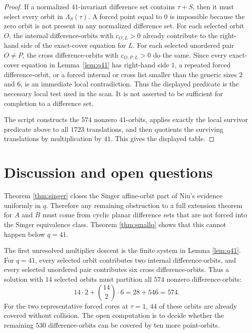 \documentclass[11pt,letterpaper]{amsart}
\theoremstyle{plain}
\begin{document}
\begin{proof}
If a normalized \(41\)-invariant difference set contains \(\tau+S\),
then it must select every orbit in \(\Lambda_S(\tau)\).  A forced point
equal to \(0\) is impossible because the zero orbit is not present in
any normalized difference set.  For each selected orbit \(O\), the
internal difference-orbits with \(c_{O,L}>0\) already contribute to the
right-hand side of the exact-cover equation for \(L\).  For each
selected unordered pair \(O\ne P\), the cross difference-orbits with
\(c_{O,P,L}>0\) do the same.  Since every exact-cover equation in
Lemma~\ref{lem:q41} has right-hand side \(1\), a repeated forced
difference-orbit, or a forced internal or cross list smaller than the
generic sizes \(2\) and \(6\), is an immediate local contradiction.
Thus the displayed predicate is the necessary local test used in the
scan.  It is not asserted to be sufficient for completion to a
difference set.

\QFortyOneAuditBlock
The script constructs the \(574\) nonzero \(41\)-orbits, applies exactly
the local survivor predicate above to all \(1723\) translations, and then
quotients the surviving translations by multiplication by \(41\).  This
gives the displayed table.
\end{proof}

\section{Discussion and open questions}

Theorem \ref{thm:singer} closes the Singer affine-orbit part of Niu's
evidence uniformly in \(q\).  Therefore any remaining obstruction to a
full extension theorem for \(A\) and \(B\) must come from cyclic planar
difference sets that are not forced into the Singer equivalence class.
Theorem \ref{thm:smallq} shows that this cannot happen below \(q=41\).

The first unresolved multiplier descent is the finite system in
Lemma \ref{lem:q41}.  For \(q=41\), every selected orbit contributes two
internal difference-orbits, and every selected unordered pair contributes
six cross difference-orbits.  Thus a solution with \(14\) selected
orbits must partition all \(574\) nonzero difference-orbits:
\[
 14\cdot 2+\binom{14}{2}\cdot 6=28+546=574.
\]
For the two representative forced cores at \(\tau=1\), \(44\) of these
orbits are already covered without collision.  The open computation is
to decide whether the remaining \(530\) difference-orbits can be covered
by ten more point-orbits.
\end{document}
